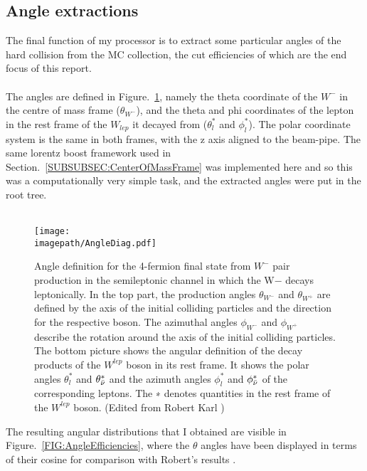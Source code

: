 \subsection{Angle extractions}
\label{SUBSEC:AngleExtractions}
The final function of my processor is to extract some particular angles of the hard collision from the MC collection, the cut efficiencies of which are the end focus of this report.
\\\\
The angles are defined in Figure.~\ref{FIG:Angles}, namely the theta coordinate of the ${W}^{-}$ in the centre of mass frame (${\theta}_{{W}^{-}}$), and the theta and phi coordinates of the lepton in the rest frame of the ${W}_{lep}$ it decayed from (${\theta}_{l}^{*}$ and ${\phi}_{l}^{*}$). The polar coordinate system is the same in both frames, with the z axis aligned to the beam-pipe. The same lorentz boost framework used in Section.~\ref{SUBSUBSEC:CenterOfMassFrame} was implemented here and so this was a computationally very simple task, and the extracted angles were put in the root tree.
\\\\
\begin{figure}
    \texttt{[image: \\imagepath/AngleDiag.pdf]}
    \caption{
    Angle definition for the 4-fermion final state from ${W}^{-}$ pair production in the semileptonic channel in which the W− decays leptonically. In the top part, the production angles ${\theta}_{{W}^{-}}$ and ${\theta}_{{W}^{+}}$ are defined by the axis of the initial colliding particles and the direction for the respective boson. The azimuthal angles ${\phi}_{{W}^{-}}$ and ${\phi}_{{W}^{+}}$ describe the rotation around the axis of the initial colliding particles.\\
    The bottom picture shows the angular definition of the decay products of the ${W}^{lep}$ boson in its rest frame. It shows the polar angles ${\theta}_{l}^{*}$ and ${\theta}_{\bar{\nu}}^{*}$ and the azimuth angles ${\phi}_{l}^{*}$ and ${\phi}_{\bar{\nu}}^{*}$ of the corresponding leptons. The ∗ denotes quantities in the rest frame of the ${W}^{lep}$ boson. (Edited from Robert Karl \cite{RobertKarl})
      }
    \label{FIG:Angles}
\end{figure}
The resulting angular distributions that I obtained are visible in Figure.~\ref{FIG:AngleEfficiencies}, where the $\theta$ angles have been displayed in terms of their cosine for comparison with Robert’s results \cite{RobertKarl}.

